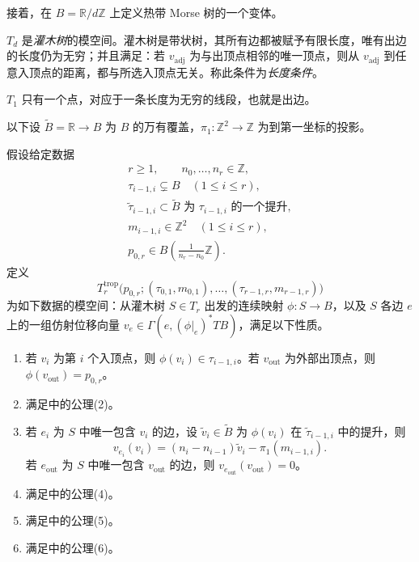 接着，在 $B=\mathbb R/d\mathbb Z$ 上定义热带 Morse 树的一个变体。
\begin{definition}\label{def:8.28}
$T_d$ 是\emph{灌木树}的模空间。灌木树是带状树，其所有边都被赋予有限长度，唯有出边的长度仍为无穷；并且满足：若 $v_{\mathrm{adj}}$ 为与出顶点相邻的唯一顶点，则从 $v_{\mathrm{adj}}$ 到任意入顶点的距离，都与所选入顶点无关。称此条件为\emph{长度条件}。

$T_1$ 只有一个点，对应于一条长度为无穷的线段，也就是出边。
\end{definition}

以下设 $\widetilde B=\mathbb R\to B$ 为 $B$ 的万有覆盖，$\pi_1\colon\mathbb Z^2\to\mathbb Z$ 为到第一坐标的投影。

\begin{definition}\label{def:8.29}
假设给定数据
\[
\begin{gathered}
r\geq1,\qquad n_0,\ldots,n_r\in\mathbb Z,\\
\tau_{i-1,i}\subsetneq B\quad(1\leq i\leq r),\\
\widetilde\tau_{i-1,i}\subset\widetilde B
\text{ 为 }\tau_{i-1,i}\text{ 的一个提升},\\
m_{i-1,i}\in\mathbb Z^2\quad(1\leq i\leq r),\\
p_{0,r}\in B\left(\frac1{n_r-n_0}\mathbb Z\right).
\end{gathered}
\]
定义
\[
T_r^{\mathrm{trop}}\bigl(p_{0,r};(\tau_{0,1},m_{0,1}),\ldots,
(\tau_{r-1,r},m_{r-1,r})\bigr)
\]
为如下数据的模空间：从灌木树 $S\in T_r$ 出发的连续映射 $\phi\colon S\to B$，以及 $S$ 各边 $e$ 上的一组仿射位移向量 $v_e\in\Gamma(e,(\phi|_e)^*TB)$，满足以下性质。
\begin{enumerate}
\item 若 $v_i$ 为第 $i$ 个入顶点，则 $\phi(v_i)\in\tau_{i-1,i}$。若 $v_{\mathrm{out}}$ 为外部出顶点，则 $\phi(v_{\mathrm{out}})=p_{0,r}$。
\item 满足中的公理(2)。
\item 若 $e_i$ 为 $S$ 中唯一包含 $v_i$ 的边，设 $\widetilde v_i\in\widetilde B$ 为 $\phi(v_i)$ 在 $\widetilde\tau_{i-1,i}$ 中的提升，则
\[
v_{e_i}(v_i)=(n_i-n_{i-1})\widetilde v_i-\pi_1(m_{i-1,i}).
\]
若 $e_{\mathrm{out}}$ 为 $S$ 中唯一包含 $v_{\mathrm{out}}$ 的边，则 $v_{e_{\mathrm{out}}}(v_{\mathrm{out}})=0$。
\item 满足中的公理(4)。
\item 满足中的公理(5)。
\item 满足中的公理(6)。
\end{enumerate}
\end{definition}

